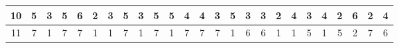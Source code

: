 \begin{sidewaystable}[]
\begin{tabular}{|c|c|c|c|c|c|c|c|c|c|c|c|c|c|c|c|c|c|c|c|c|c|c|c|c|}
    10      & 5                                               & 3                                               & 5                                               & 6                                               & 2                                               & 3                                               & 5                                               & 3                                               & 5                                               & 5                                                & 4                                                & 4                                                & 3                                               & 5                                               & 3                                               & 3                                               & 2                                               & 4                                               & 3                                               & 4                                               & 2                                               & 6                                                & 2                                                & 4                                                \\ \hline
    11      & 7                                               & 1                                               & 7                                               & 7                                               & 1                                               & 1                                               & 7                                               & 1                                               & 7                                               & 1                                                & 7                                                & 7                                                & 7                                               & 1                                               & 6                                               & 6                                               & 1                                               & 1                                               & 5                                               & 1                                               & 5                                               & 2                                                & 7                                                & 6                                                \\ \hline

\end{tabular}
\end{sidewaystable}
